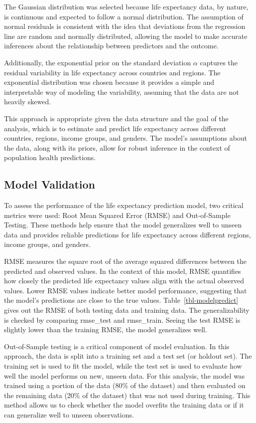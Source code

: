 \documentclass[
  letterpaper,
  DIV=11,
  numbers=noendperiod]{scrartcl}
\begin{document}
The Gaussian distribution was selected because life expectancy data, by
nature, is continuous and expected to follow a normal distribution. The
assumption of normal residuals is consistent with the idea that
deviations from the regression line are random and normally distributed,
allowing the model to make accurate inferences about the relationship
between predictors and the outcome.

Additionally, the exponential prior on the standard deviation \(\alpha\)
captures the residual variability in life expectancy across countries
and regions. The exponential distribution was chosen because it provides
a simple and interpretable way of modeling the variability, assuming
that the data are not heavily skewed.

This approach is appropriate given the data structure and the goal of
the analysis, which is to estimate and predict life expectancy across
different countries, regions, income groups, and genders. The model's
assumptions about the data, along with its priors, allow for robust
inference in the context of population health predictions.

\subsection{Model Validation}\label{model-validation}

To assess the performance of the life expectancy prediction model, two
critical metrics were used: Root Mean Squared Error (RMSE) and
Out-of-Sample Testing. These methods help ensure that the model
generalizes well to unseen data and provides reliable predictions for
life expectancy across different regions, income groups, and genders.

RMSE measures the square root of the average squared differences between
the predicted and observed values. In the context of this model, RMSE
quantifies how closely the predicted life expectancy values align with
the actual observed values. Lower RMSE values indicate better model
performance, suggesting that the model's predictions are close to the
true values. Table~\ref{tbl-modelpredict} gives out the RMSE of both
testing data and training data. The generalizability is checked by
comparing rmse\_test and rmse\_train. Seeing the test RMSE is slightly
lower than the training RMSE, the model generalizes well.

Out-of-Sample testing is a critical component of model evaluation. In
this approach, the data is split into a training set and a test set (or
holdout set). The training set is used to fit the model, while the test
set is used to evaluate how well the model performs on new, unseen data.
For this analysis, the model was trained using a portion of the data
(80\% of the dataset) and then evaluated on the remaining data (20\% of
the dataset) that was not used during training. This method allows us to
check whether the model overfits the training data or if it can
generalize well to unseen observations.
\end{document}
